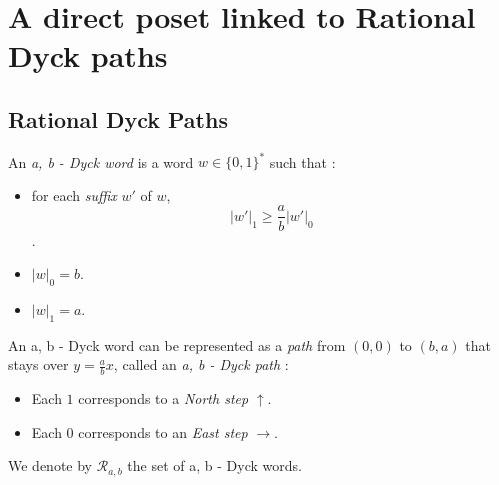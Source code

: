 \section{A direct poset linked to Rational Dyck paths}

\subsection{Rational Dyck Paths}

\begin{definition}
    An \emph{a, b - Dyck word} is a word $w \in \{0,1\}^*$
    such that :
    \begin{itemize}
        \item for each \emph{suffix} $w'$ of $w$,
            $$|w'|_1 \geqslant \frac{a}{b}|w'|_0$$.
        \item $|w|_0 = b$.
        \item $|w|_1 = a$.
    \end{itemize}
    An a, b - Dyck word can be represented as a 
    \emph{path} from $(0,0)$ to $(b,a)$ that stays over
    $y = \frac{a}{b}x$, called an \emph{a, b - Dyck path} :
    \begin{itemize}
        \item Each $1$ corresponds to a \emph{North step}
        $\uparrow$. 
        \item Each $0$ corresponds to an \emph{East step}
        $\rightarrow$.
    \end{itemize}
    We denote by $\mathcal{R}_{a, b}$ the set of
    a, b - Dyck words.
\end{definition}

